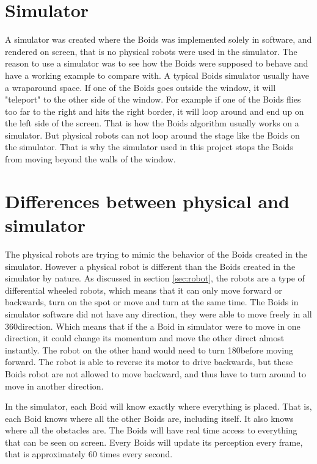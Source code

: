 \section{Simulator}
A simulator was created where the Boids was implemented solely in software, and rendered on screen, that is no physical robots were used in the simulator. The reason to use a simulator was to see how the Boids were supposed to behave and have a working example to compare with. A typical Boids simulator usually have a wraparound space. If one of the Boids goes outside the window, it will "teleport" to the other side of the window. For example if one of the Boids flies too far to the right and hits the right border, it will loop around and end up on the left side of the screen. That is how the Boids algorithm usually works on a simulator. But physical robots can not loop around the stage like the Boids on the simulator. That is why the simulator used in this project stops the Boids from moving beyond the walls of the window.



\section{Differences between physical and simulator}
The physical robots are trying to mimic the behavior of the Boids created in the simulator. However a physical robot is different than the Boids created in the simulator by nature. As discussed in section \ref{sec:robot}, the robots are a type of differential wheeled robots, which means that it can only move forward or backwards, turn on the spot or move and turn at the same time. The Boids in simulator software did not have any direction, they were able to move freely in all 360\textdegree direction. Which means that if the a Boid in simulator were to move in one direction, it could change its momentum and move the other direct almost instantly. The robot on the other hand would need to turn 180\textdegree before moving forward. The robot is able to reverse its motor to drive backwards, but these Boids robot are not allowed to move backward, and thus have to turn around to move in another direction.

In the simulator, each Boid will know exactly where everything is placed. That is, each Boid knows where all the other Boids are, including itself. It also knows where all the obstacles are. The Boids will have real time access to everything that can be seen on screen. Every Boids will update its perception every frame, that is approximately 60 times every second.

